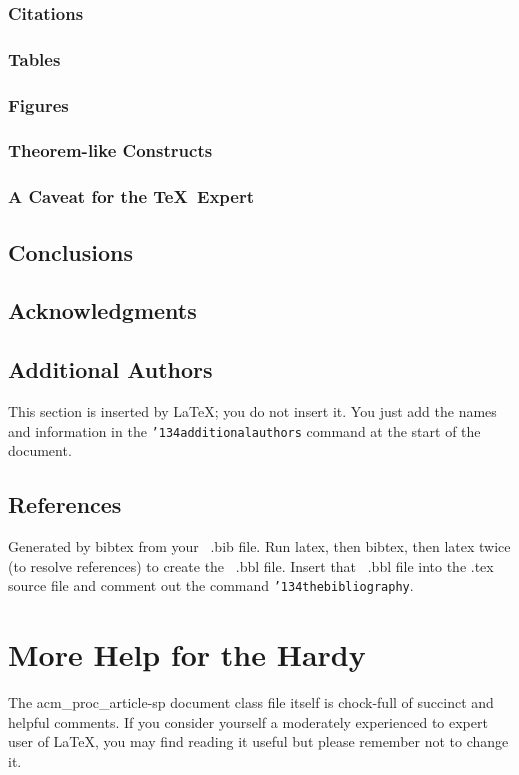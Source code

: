 \documentclass{acm_proc_article-sp}
\begin{document}
\subsubsection{Citations}
\subsubsection{Tables}
\subsubsection{Figures}
\subsubsection{Theorem-like Constructs}
\subsubsection*{A Caveat for the \TeX\ Expert}
\subsection{Conclusions}
\subsection{Acknowledgments}
\subsection{Additional Authors}
This section is inserted by \LaTeX; you do not insert it.
You just add the names and information in the
\texttt{{\char'134}additionalauthors} command at the start
of the document.
\subsection{References}
Generated by bibtex from your ~.bib file.  Run latex,
then bibtex, then latex twice (to resolve references)
to create the ~.bbl file.  Insert that ~.bbl file into
the .tex source file and comment out
the command \texttt{{\char'134}thebibliography}.
\section{More Help for the Hardy}
The acm\_proc\_article-sp document class file itself is chock-full of succinct
and helpful comments.  If you consider yourself a moderately
experienced to expert user of \LaTeX, you may find reading
it useful but please remember not to change it.
\balancecolumns
\end{document}
